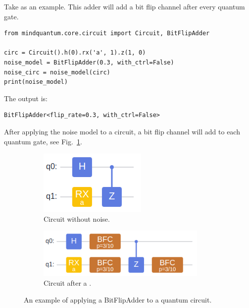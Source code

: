 Take \BitFlipAdder as an example. This adder will add a bit flip channel after every quantum gate.
\begin{lstlisting}
from mindquantum.core.circuit import Circuit, BitFlipAdder

circ = Circuit().h(0).rx('a', 1).z(1, 0)
noise_model = BitFlipAdder(0.3, with_ctrl=False)
noise_circ = noise_model(circ)
print(noise_model)
\end{lstlisting}
The output is:
\begin{lstlisting}
BitFlipAdder<flip_rate=0.3, with_ctrl=False>
\end{lstlisting}
After applying the noise model to a circuit, a bit flip channel will add to each quantum gate, see Fig.~\ref{fig:bit_flip_adder}.
\begin{figure}
    \centering
    \begin{subfigure}{0.2\textwidth}
        \centering
        \includegraphics[width=\textwidth]{images/3_3_no_bit_fip.png}
        \caption{Circuit without noise.}
    \end{subfigure}
    \begin{subfigure}{0.4\textwidth}
        \centering
        \includegraphics[width=0.9\textwidth]{images/3_3_bit_fip.png}
        \caption{Circuit after a .}
    \end{subfigure}
    \caption{An example of applying a BitFlipAdder to a quantum circuit.}
    \label{fig:bit_flip_adder}
\end{figure}

